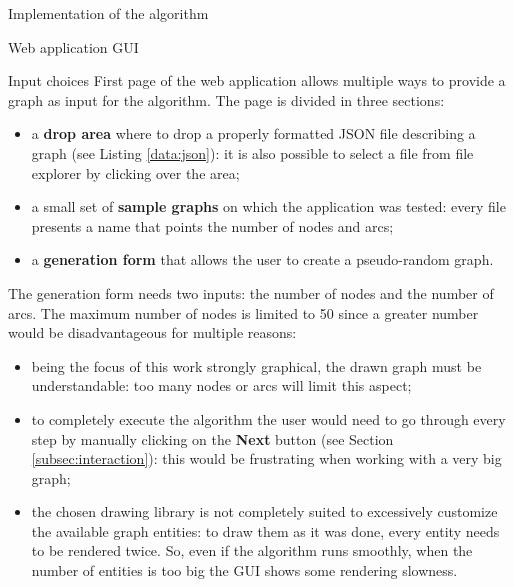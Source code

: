 \documentclass[9pt]{extarticle}
\begin{document}
\begin{section}{Implementation of the algorithm}
\begin{subsection}{Web application GUI}
            \begin{subsubsection}{Input choices}
                \label{subsec:input}
                First page of the web application\cite{web:app} allows multiple ways to provide a graph as input for the
                algorithm. The page is divided in three sections:
                
                \begin{itemize}
                    \item a \textbf{drop area} where to drop a properly formatted JSON file describing a graph (see Listing \ref{data:json}): it is also 
                            possible to select a file from file explorer by clicking over the area;
                    \item a small set of \textbf{sample graphs} on which the application was tested: every file presents a name that points the 
                            number of nodes and arcs;
                    \item a \textbf{generation form} that allows the user to create a pseudo-random graph.
                \end{itemize}

                The generation form needs two inputs: the number of nodes and the number of arcs.
                The maximum number of nodes is limited to 50 since a greater number would be disadvantageous for multiple reasons:

                \begin{itemize}
                    \item being the focus of this work strongly graphical, the drawn graph must be understandable: too many nodes or arcs will
                            limit this aspect;
                    \item to completely execute the algorithm the user would need to go through every step by manually clicking on the \textbf{Next} button 
                            (see Section \ref{subsec:interaction}): this would be frustrating when working with a very big graph;
                    \item the chosen drawing library is not completely suited to excessively customize the available graph entities: to draw them as it was
                            done, every entity needs to be rendered twice. So, even if the algorithm runs smoothly, when the number of entities is too big
                            the GUI shows some rendering slowness.
                \end{itemize}
               

\end{subsubsection}
\end{subsection}
\end{section}
\end{document}
